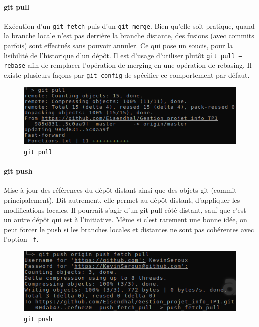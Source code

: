 \documentclass[11pt,canadien]{article}
\begin{document}
\paragraph{git pull}Exécution d'un \texttt{git fetch} puis d'un \texttt{git merge}. Bien qu'elle soit pratique, quand la branche locale n'est pas derrière la branche distante, des fusions (avec commits parfois) sont effectués sans pouvoir annuler. Ce qui pose un soucis, pour la lisibilité de l'historique d'un dépôt. Il est d'usage d'utiliser plutôt \texttt{git pull --rebase} afin de remplacer l'opération de merging en une opération de rebasing. Il existe plusieurs façons par \texttt{git config} de spécifier ce comportement par défaut.
\begin{figure}[h]
	\centering
	\includegraphics{images/git_pull.png}
	\caption{\texttt{git pull}}
	\label{fig:git_pull}
\end{figure}

\paragraph{git push}Mise à jour des références du dépôt distant ainsi que des objets git (commit principalement). Dit autrement, elle permet au dépôt distant, d'appliquer les modifications locales. Il pourrait s'agir d'un git pull côté distant, sauf que c'est un autre dépôt qui est à l'initiative. Même si c'est rarement une bonne idée, on peut forcer le push si les branches locales et distantes ne sont pas cohérentes avec l'option \texttt{-f}.
\begin{figure}[h]
	\centering
	\includegraphics{images/git_push.png}
	\caption{\texttt{git push}}
	\label{fig:git_push}
\end{figure}
\end{document}
